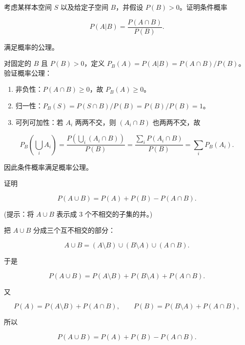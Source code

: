 ﻿





\begin{question}
考虑某样本空间 \(S\) 以及给定子空间 \(B\)，并假设 \(P(B)>0\)。证明条件概率

\[
P(A|B)=\frac{P(A\cap B)}{P(B)}.
\]

满足概率的公理。
\begin{solution}
对固定的 \(B\) 且 \(P(B)>0\)，定义
\(P_B(A)=P(A|B)=P(A\cap B)/P(B)\)。验证概率公理：

\begin{enumerate}
\item
  非负性：\(P(A\cap B)\ge0\)，故 \(P_B(A)\ge0\)。
\item
  归一性：\(P_B(S)=P(S\cap B)/P(B)=P(B)/P(B)=1\)。
\item
  可列可加性：若 \(A_i\) 两两不交，则 \((A_i\cap B)\) 也两两不交，故
\end{enumerate}

\[
P_B\left(\bigcup_i A_i\right)=\frac{P\left(\bigcup_i(A_i\cap B)\right)}{P(B)}
=\frac{\sum_iP(A_i\cap B)}{P(B)}=\sum_iP_B(A_i).
\]

因此条件概率满足概率公理。
\end{solution}
\end{question}



\begin{question}
证明

\[
P(A\cup B)=P(A)+P(B)-P(A\cap B).
\]

(提示：将 \(A\cup B\) 表示成 3 个不相交的子集的并。)
\begin{solution}
把 \(A\cup B\) 分成三个互不相交的部分：

\[
A\cup B=(A\setminus B)\cup(B\setminus A)\cup(A\cap B).
\]

于是

\[
P(A\cup B)=P(A\setminus B)+P(B\setminus A)+P(A\cap B).
\]

又

\[
P(A)=P(A\setminus B)+P(A\cap B),\qquad
P(B)=P(B\setminus A)+P(A\cap B),
\]

所以

\[
P(A\cup B)=P(A)+P(B)-P(A\cap B).
\]
\end{solution}
\end{question}




